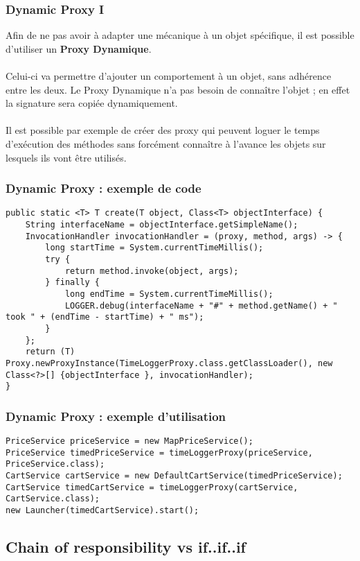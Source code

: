 \begin{frame}[fragile]
	\frametitle{Dynamic Proxy I}
Afin de ne pas avoir \`{a} adapter une m\'{e}canique \`{a} un objet sp\'{e}cifique, il est possible d'utiliser un \textbf{Proxy Dynamique}. 
\\~\\
Celui-ci va permettre d'ajouter un comportement \`{a} un objet, sans adh\'{e}rence entre les deux. Le Proxy Dynamique n'a pas besoin de conna\^{i}tre l'objet ; en effet la signature sera copi\'{e}e dynamiquement.
\\~\\
Il est possible par exemple de cr\'{e}er des proxy qui peuvent loguer le temps d'ex\'{e}cution des m\'{e}thodes sans forc\'{e}ment conna\^{i}tre \`{a} l'avance les objets sur lesquels ils vont \^{e}tre utilis\'{e}s.
\end{frame}

\begin{frame}[fragile]
	\frametitle{Dynamic Proxy : exemple de code}

	\begin{lstlisting}
public static <T> T create(T object, Class<T> objectInterface) {
	String interfaceName = objectInterface.getSimpleName();
	InvocationHandler invocationHandler = (proxy, method, args) -> {
		long startTime = System.currentTimeMillis();
		try {
			return method.invoke(object, args);
		} finally {
			long endTime = System.currentTimeMillis();
			LOGGER.debug(interfaceName + "#" + method.getName() + " took " + (endTime - startTime) + " ms");
		}
	};
	return (T) Proxy.newProxyInstance(TimeLoggerProxy.class.getClassLoader(), new Class<?>[] {objectInterface }, invocationHandler);
}
	\end{lstlisting}
\end{frame}

\begin{frame}[fragile]
	\frametitle{Dynamic Proxy : exemple d'utilisation}

\begin{lstlisting}
PriceService priceService = new MapPriceService();
PriceService timedPriceService = timeLoggerProxy(priceService, PriceService.class);
CartService cartService = new DefaultCartService(timedPriceService);
CartService timedCartService = timeLoggerProxy(cartService, CartService.class);
new Launcher(timedCartService).start();
    \end{lstlisting}
\end{frame}

\subsection{Chain of responsibility vs if..if..if}

